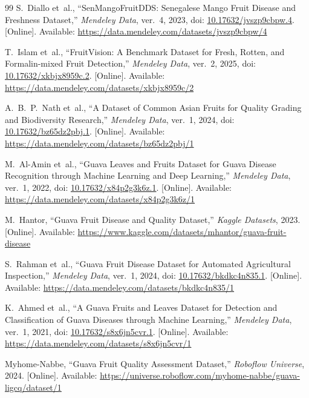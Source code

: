 \documentclass[11pt,a4paper]{article}
\begin{document}
\begin{thebibliography}{99}
S.~Diallo et~al., ``SenMangoFruitDDS: Senegalese Mango Fruit Disease and Freshness Dataset,'' \emph{Mendeley Data}, ver.~4, 2023, doi: \href{https://doi.org/10.17632/jvszp9cbpw.4}{10.17632/jvszp9cbpw.4}. [Online]. Available: \url{https://data.mendeley.com/datasets/jvszp9cbpw/4}

T.~Islam et~al., ``FruitVision: A Benchmark Dataset for Fresh, Rotten, and Formalin-mixed Fruit Detection,'' \emph{Mendeley Data}, ver.~2, 2025, doi: \href{https://doi.org/10.17632/xkbjx8959c.2}{10.17632/xkbjx8959c.2}. [Online]. Available: \url{https://data.mendeley.com/datasets/xkbjx8959c/2}

A.~B.~P.~Nath et~al., ``A Dataset of Common Asian Fruits for Quality Grading and Biodiversity Research,'' \emph{Mendeley Data}, ver.~1, 2024, doi: \href{https://doi.org/10.17632/bz65dz2pbj.1}{10.17632/bz65dz2pbj.1}. [Online]. Available: \url{https://data.mendeley.com/datasets/bz65dz2pbj/1}


M.~Al-Amin et~al., ``Guava Leaves and Fruits Dataset for Guava Disease Recognition through Machine Learning and Deep Learning,'' \emph{Mendeley Data}, ver.~1, 2022, doi: \href{https://doi.org/10.17632/x84p2g3k6z.1}{10.17632/x84p2g3k6z.1}. [Online]. Available: \url{https://data.mendeley.com/datasets/x84p2g3k6z/1}

M.~Hantor, ``Guava Fruit Disease and Quality Dataset,'' \emph{Kaggle Datasets}, 2023. [Online]. Available: \url{https://www.kaggle.com/datasets/mhantor/guava-fruit-disease}

S.~Rahman et~al., ``Guava Fruit Disease Dataset for Automated Agricultural Inspection,'' \emph{Mendeley Data}, ver.~1, 2024, doi: \href{https://doi.org/10.17632/bkdkc4n835.1}{10.17632/bkdkc4n835.1}. [Online]. Available: \url{https://data.mendeley.com/datasets/bkdkc4n835/1}

K.~Ahmed et~al., ``A Guava Fruits and Leaves Dataset for Detection and Classification of Guava Diseases through Machine Learning,'' \emph{Mendeley Data}, ver.~1, 2021, doi: \href{https://doi.org/10.17632/s8x6jn5cvr.1}{10.17632/s8x6jn5cvr.1}. [Online]. Available: \url{https://data.mendeley.com/datasets/s8x6jn5cvr/1}

Myhome-Nabbe, ``Guava Fruit Quality Assessment Dataset,'' \emph{Roboflow Universe}, 2024. [Online]. Available: \url{https://universe.roboflow.com/myhome-nabbe/guava-ligcq/dataset/1}


\end{thebibliography}
\end{document}
